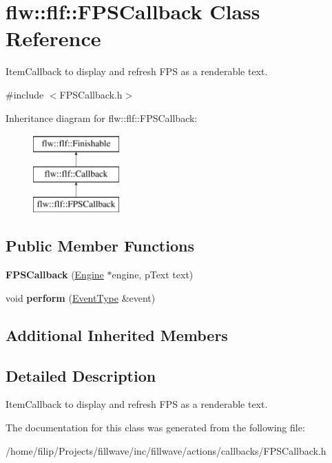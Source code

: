 \hypertarget{classflw_1_1flf_1_1FPSCallback}{}\section{flw\+:\+:flf\+:\+:F\+P\+S\+Callback Class Reference}
\label{classflw_1_1flf_1_1FPSCallback}


Item\+Callback to display and refresh F\+PS as a renderable text.  




{\ttfamily \#include $<$F\+P\+S\+Callback.\+h$>$}

Inheritance diagram for flw\+:\+:flf\+:\+:F\+P\+S\+Callback\+:\begin{figure}[H]
\begin{center}
\leavevmode
\includegraphics[height=3.000000cm]{classflw_1_1flf_1_1FPSCallback}
\end{center}
\end{figure}
\subsection*{Public Member Functions}
\begin{DoxyCompactItemize}
\item 
{\bfseries F\+P\+S\+Callback} (\hyperlink{classflw_1_1Engine}{Engine} $\ast$engine, p\+Text text)\hypertarget{classflw_1_1flf_1_1FPSCallback_acac067ca5228b11a0037bac1f795977a}{}\label{classflw_1_1flf_1_1FPSCallback_acac067ca5228b11a0037bac1f795977a}

\item 
void {\bfseries perform} (\hyperlink{classflw_1_1flf_1_1EventType}{Event\+Type} \&event)\hypertarget{classflw_1_1flf_1_1FPSCallback_a2cdbd06e7b0f63958ed32763ef9fd41d}{}\label{classflw_1_1flf_1_1FPSCallback_a2cdbd06e7b0f63958ed32763ef9fd41d}

\end{DoxyCompactItemize}
\subsection*{Additional Inherited Members}


\subsection{Detailed Description}
Item\+Callback to display and refresh F\+PS as a renderable text. 

The documentation for this class was generated from the following file\+:\begin{DoxyCompactItemize}
\item 
/home/filip/\+Projects/fillwave/inc/fillwave/actions/callbacks/F\+P\+S\+Callback.\+h\end{DoxyCompactItemize}
